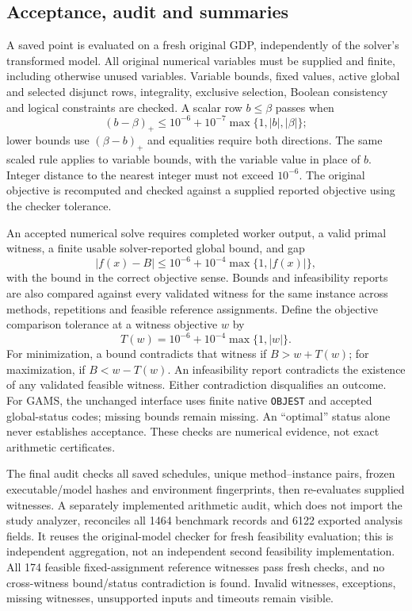 \subsection{Acceptance, audit and summaries}\label{sec:acceptance}
A saved point is evaluated on a fresh original GDP, independently of the solver's transformed model. All original numerical variables must be supplied and finite, including otherwise unused variables. Variable bounds, fixed values, active global and selected disjunct rows, integrality, exclusive selection, Boolean consistency and logical constraints are checked. A scalar row $b\le\beta$ passes when
\[
 (b-\beta)_+\le10^{-6}+10^{-7}\max\{1,|b|,|\beta|\};
\]
lower bounds use $(\beta-b)_+$ and equalities require both directions. The same scaled rule applies to variable bounds, with the variable value in place of $b$. Integer distance to the nearest integer must not exceed $10^{-6}$. The original objective is recomputed and checked against a supplied reported objective using the checker tolerance.

An accepted numerical solve requires completed worker output, a valid primal witness, a finite usable solver-reported global bound, and gap
\begin{equation}\label{eq:accept-gap}
 |f(x)-B|\le 10^{-6}+10^{-4}\max\{1,|f(x)|\},
\end{equation}
with the bound in the correct objective sense. Bounds and infeasibility reports are also compared against every validated witness for the same instance across methods, repetitions and feasible reference assignments. Define the objective comparison tolerance at a witness objective $w$ by
\begin{equation}\label{eq:comparison-tolerance}
 T(w)=10^{-6}+10^{-4}\max\{1,|w|\}.
\end{equation}
For minimization, a bound contradicts that witness if $B>w+T(w)$; for maximization, if $B<w-T(w)$. An infeasibility report contradicts the existence of any validated feasible witness. Either contradiction disqualifies an outcome. For GAMS, the unchanged interface uses finite native \texttt{OBJEST} and accepted global-status codes; missing bounds remain missing. An ``optimal'' status alone never establishes acceptance. These checks are numerical evidence, not exact arithmetic certificates.

The final audit checks all saved schedules, unique method--instance pairs, frozen executable/model hashes and environment fingerprints, then re-evaluates supplied witnesses. A separately implemented arithmetic audit, which does not import the study analyzer, reconciles all 1464 benchmark records and 6122 exported analysis fields. It reuses the original-model checker for fresh feasibility evaluation; this is independent aggregation, not an independent second feasibility implementation. All 174 feasible fixed-assignment reference witnesses pass fresh checks, and no cross-witness bound/status contradiction is found. Invalid witnesses, exceptions, missing witnesses, unsupported inputs and timeouts remain visible.

